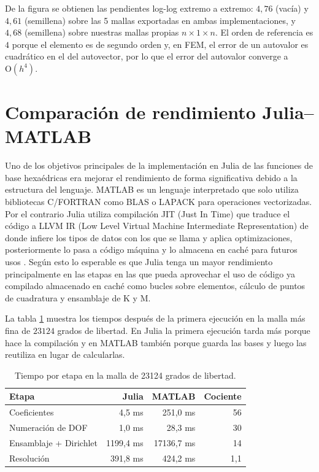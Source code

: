 \documentclass[12pt]{report} %
\begin{document}
De la figura se obtienen las pendientes log-log extremo a extremo: $4{,}76$ (vacía) y $4{,}61$ (semillena) sobre las 5 mallas exportadas en ambas implementaciones, y $4{,}68$ (semillena) sobre nuestras mallas propias $n\times1\times n$. El orden de referencia es $4$ porque el elemento es de segundo orden y, en FEM, el error de un autovalor es cuadrático en el del autovector, por lo que el error del autovalor converge a $\mathrm{O}(h^4)$.

\section{Comparación de rendimiento Julia--MATLAB}\label{sec:res-rendimiento}

Uno de los objetivos principales de la implementación en Julia de las funciones de base hexaédricas era mejorar el rendimiento de forma significativa debido a la estructura del lenguaje. MATLAB es un lenguaje interpretado que solo utiliza bibliotecas C/FORTRAN como BLAS o LAPACK para operaciones vectorizadas. Por el contrario Julia utiliza compilación JIT (Just In Time) que traduce el código a LLVM IR (Low Level Virtual Machine Intermediate Representation) de donde infiere los tipos de datos con los que se llama y aplica optimizaciones, posteriormente lo pasa a código máquina y lo almacena en caché para futuros usos \cite{juliajitdocs}. Según esto lo esperable es que Julia tenga un mayor rendimiento principalmente en las etapas en las que pueda aprovechar el uso de código ya compilado almacenado en caché como bucles sobre elementos, cálculo de puntos de cuadratura y ensamblaje de K y M.


La tabla \ref{tab:tiempos} muestra los tiempos después de la primera ejecución en la malla más fina de $23124$ grados de libertad. En Julia la primera ejecución tarda más porque hace la compilación y en MATLAB también porque guarda las bases y luego las reutiliza en lugar de calcularlas.

\begin{table}[htbp]
	\centering
	\caption{Tiempo por etapa en la malla de 23124 grados de libertad.}
	\label{tab:tiempos}
	\begin{tabular}{lrrr}
		\toprule
		\textbf{Etapa} & \textbf{Julia} & \textbf{MATLAB} & \textbf{Cociente} \\
		\midrule
		Coeficientes & 4,5 ms & 251,0 ms & 56 \\
		Numeración de DOF & 1,0 ms & 28,3 ms & 30 \\
		Ensamblaje + Dirichlet & 1199,4 ms & 17136,7 ms & 14 \\
		Resolución & 391,8 ms & 424,2 ms & 1,1 \\
		\bottomrule
	\end{tabular}
\end{table}
\end{document}
